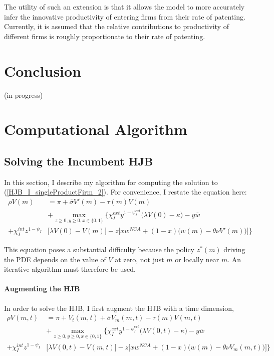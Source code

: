 \documentclass[12pt,english]{article}
\theoremstyle{remark}
\begin{document}
The utility of such an extension is that it allows the model to more accurately infer the innovative productivity of entering firms from their rate of patenting. Currently, it is assumed that the relative contributions to productivity of different firms is roughly proportionate to their rate of patenting.

\section{Conclusion}\label{conclusion}

(in progress)



\break
\appendix


\section{Computational Algorithm}

\subsection{Solving the Incumbent HJB}

In this section, I describe my algorithm for computing the solution to (\ref{HJB_I_singleProductFirm_2}). For convenience, I restate the equation here: 
\begin{align}
\rho V(m) &= \pi + \bar{\sigma} V'(m)  - \tau(m) V(m) \nonumber \\ 
& + \max_{z \ge 0, y \ge 0, x \in \{0,1\}} \Bigg\{ \chi_I^{ext} y^{1-\psi_I^{ext}} \Big( \lambda V(0) - \kappa \Big) - y \bar{w} \nonumber \\
+  \chi_I^{int} z^{1-\psi_I} &\Bigg[ \lambda V(0) - V(m) \Bigg] - z \Bigg[ x w^{NCA} + (1-x) \Big( w(m) - \theta \nu V'(m)\Big) \Bigg] \Bigg\} \label{HJB_I_singleProductFirm_2_appendix}
\end{align}

This equation poses a substantial difficulty because the policy $z^*(m)$ driving the PDE depends on the value of $V$ at zero, not just $m$ or locally near $m$. An iterative algorithm must therefore be used.

\paragraph{Augmenting the HJB}

In order to solve the HJB, I first augment the HJB with a time dimension, 
\begin{align}
\rho V(m,t) &= \pi + V_t(m,t) + \bar{\sigma} V_m(m,t)  - \tau(m) V(m,t) \nonumber \\ 
& + \max_{z \ge 0, y \ge 0, x \in \{0,1\}} \Bigg\{ \chi_I^{ext} y^{1-\psi_I^{ext}} \Big( \lambda V(0,t) - \kappa \Big) - y \bar{w} \nonumber \\
+  \chi_I^{int} z^{1-\psi_I} &\Bigg[ \lambda V(0,t) - V(m,t) \Bigg] - z \Bigg[ x w^{NCA} + (1-x) \Big( w(m) - \theta \nu V_m(m,t)\Big) \Bigg] \Bigg\}  \label{HJB_I_augmented}
\end{align}
\end{document}
